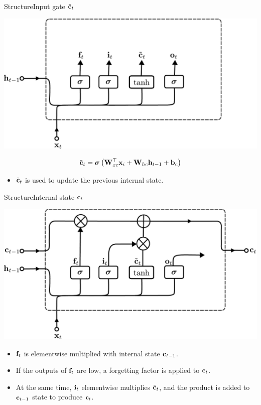 \documentclass{beamer}
\begin{document}
\begin{frame}{Structure}{Input gate  $\tilde{{\bf c}}_t$}
\begin{center}
 \includegraphics[scale=0.4]{Module 5 (RNN)/pics/LSTM_int_stat.pdf}
 \end{center}   
 \begin{equation}
    \tilde{{\bf c}}_t = {\boldsymbol \sigma}\left({\bf W}_{xc}^\top {\bf x}_i +{\bf W}_{hc}{\bf h}_{t-1} + {\bf b}_c\right)
\end{equation}
 \begin{itemize}
\item $\tilde{{\bf c}}_t$ is used to update the previous internal state. 
\end{itemize}
\end{frame}
\begin{frame}{Structure}{Internal state  ${\bf c}_t$}
    \begin{center}
 \includegraphics[scale=0.4]{Module 5 (RNN)/pics/LSTM_int_stat2.pdf}
 \end{center} 
 \begin{itemize}
     \item ${\bf f}_t$ is elementwise  multiplied with internal state ${\bf c}_{t-1}$. 
     \item If the outputs of  ${\bf f}_t$ are low, a forgetting factor is applied to ${\bf c}_t$. 
     \item At the same time, ${\bf i}_t$ elementwise multiplies  ${\tilde{{\bf c}}}_t$, and the product is added to  ${\bf c}_{t-1}$ state to produce ${\bf c}_t$.
 \end{itemize}
\end{frame}
\end{document}
